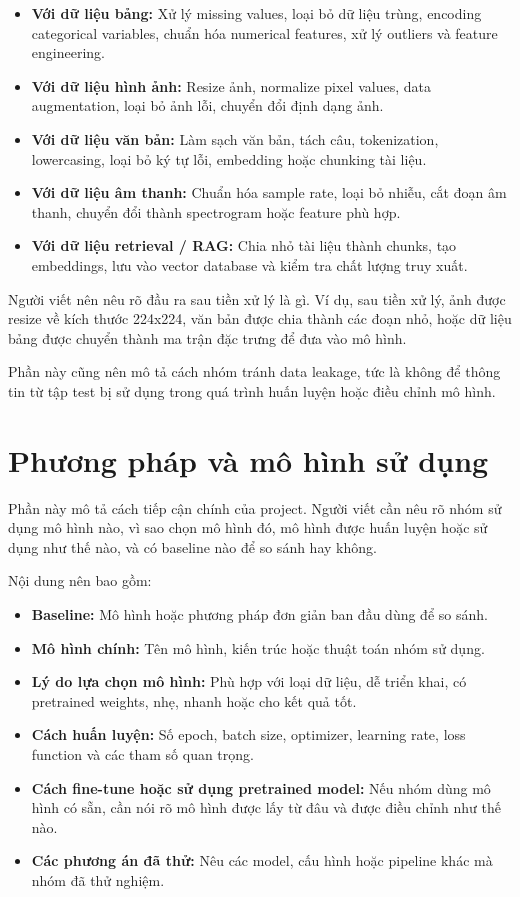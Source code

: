 \documentclass[12pt]{ai_conquer2026}
\begin{document}
\begin{itemize}
\item \textbf{Với dữ liệu bảng:} Xử lý missing values, loại bỏ dữ liệu trùng, encoding categorical variables, chuẩn hóa numerical features, xử lý outliers và feature engineering.
\item \textbf{Với dữ liệu hình ảnh:} Resize ảnh, normalize pixel values, data augmentation, loại bỏ ảnh lỗi, chuyển đổi định dạng ảnh.
\item \textbf{Với dữ liệu văn bản:} Làm sạch văn bản, tách câu, tokenization, lowercasing, loại bỏ ký tự lỗi, embedding hoặc chunking tài liệu.
\item \textbf{Với dữ liệu âm thanh:} Chuẩn hóa sample rate, loại bỏ nhiễu, cắt đoạn âm thanh, chuyển đổi thành spectrogram hoặc feature phù hợp.
\item \textbf{Với dữ liệu retrieval / RAG:} Chia nhỏ tài liệu thành chunks, tạo embeddings, lưu vào vector database và kiểm tra chất lượng truy xuất.
\end{itemize}

Người viết nên nêu rõ đầu ra sau tiền xử lý là gì. Ví dụ, sau tiền xử lý, ảnh được resize về kích thước 224x224, văn bản được chia thành các đoạn nhỏ, hoặc dữ liệu bảng được chuyển thành ma trận đặc trưng để đưa vào mô hình.

Phần này cũng nên mô tả cách nhóm tránh data leakage, tức là không để thông tin từ tập test bị sử dụng trong quá trình huấn luyện hoặc điều chỉnh mô hình.

\section{Phương pháp và mô hình sử dụng}

Phần này mô tả cách tiếp cận chính của project. Người viết cần nêu rõ nhóm sử dụng mô hình nào, vì sao chọn mô hình đó, mô hình được huấn luyện hoặc sử dụng như thế nào, và có baseline nào để so sánh hay không.

Nội dung nên bao gồm:

\begin{itemize}
\item \textbf{Baseline:} Mô hình hoặc phương pháp đơn giản ban đầu dùng để so sánh.
\item \textbf{Mô hình chính:} Tên mô hình, kiến trúc hoặc thuật toán nhóm sử dụng.
\item \textbf{Lý do lựa chọn mô hình:} Phù hợp với loại dữ liệu, dễ triển khai, có pretrained weights, nhẹ, nhanh hoặc cho kết quả tốt.
\item \textbf{Cách huấn luyện:} Số epoch, batch size, optimizer, learning rate, loss function và các tham số quan trọng.
\item \textbf{Cách fine-tune hoặc sử dụng pretrained model:} Nếu nhóm dùng mô hình có sẵn, cần nói rõ mô hình được lấy từ đâu và được điều chỉnh như thế nào.
\item \textbf{Các phương án đã thử:} Nêu các model, cấu hình hoặc pipeline khác mà nhóm đã thử nghiệm.
\end{itemize}
\end{document}
